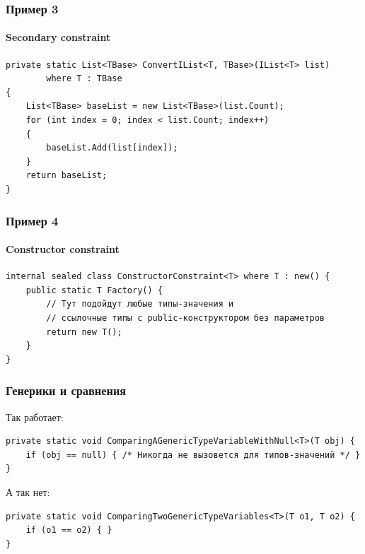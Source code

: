 \documentclass{../../slides-style}
\begin{document}
    \begin{frame}[fragile]
        \frametitle{Пример 3}
        \framesubtitle{Secondary constraint}
        \begin{footnotesize}
            \begin{verbatim}
private static List<TBase> ConvertIList<T, TBase>(IList<T> list)
        where T : TBase 
{
    List<TBase> baseList = new List<TBase>(list.Count);
    for (int index = 0; index < list.Count; index++) 
    {
        baseList.Add(list[index]);
    }
    return baseList;
}
            \end{verbatim}
        \end{footnotesize}
    \end{frame}

    \begin{frame}[fragile]
        \frametitle{Пример 4}
        \framesubtitle{Constructor constraint}
        \begin{footnotesize}
            \begin{verbatim}
internal sealed class ConstructorConstraint<T> where T : new() {
    public static T Factory() {
        // Тут подойдут любые типы-значения и 
        // ссылочные типы с public-конструктором без параметров
        return new T();
    }
}
            \end{verbatim}
        \end{footnotesize}
    \end{frame}

    \begin{frame}[fragile]
        \frametitle{Генерики и сравнения}
        Так работает:
        \begin{footnotesize}
            \begin{verbatim}
private static void ComparingAGenericTypeVariableWithNull<T>(T obj) {
    if (obj == null) { /* Никогда не вызовется для типов-значений */ }
}
            \end{verbatim}
        \end{footnotesize}
        \vspace{5mm}
        А так нет:
        \begin{footnotesize}
            \begin{verbatim}
private static void ComparingTwoGenericTypeVariables<T>(T o1, T o2) {
    if (o1 == o2) { }
}
            \end{verbatim}
        \end{footnotesize}
    \end{frame}
\end{document}
